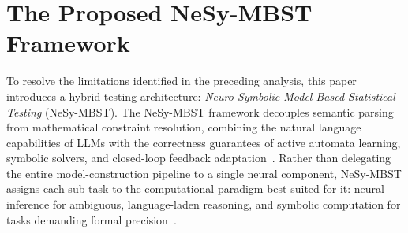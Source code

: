 
\section{The Proposed NeSy-MBST Framework}%
\label{sec:framework}

To resolve the limitations identified in the preceding analysis, this paper introduces a hybrid testing architecture: \emph{Neuro-Symbolic Model-Based Statistical Testing} (NeSy-MBST). The NeSy-MBST framework decouples semantic parsing from mathematical constraint resolution, combining the natural language capabilities of LLMs with the correctness guarantees of active automata learning, symbolic solvers, and closed-loop feedback adaptation~\cite{neuro_symbolic_framework, garcez2023neurosymbolic}. Rather than delegating the entire model-construction pipeline to a single neural component, NeSy-MBST assigns each sub-task to the computational paradigm best suited for it: neural inference for ambiguous, language-laden reasoning, and symbolic computation for tasks demanding formal precision~\cite{llm_state_machine_frameworks}.

